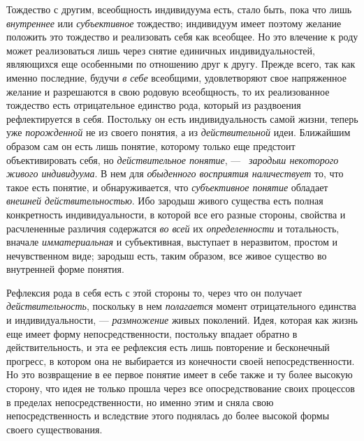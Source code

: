 \documentclass[twoside]{article}
\begin{document}
{{{Тождество с другим, всеобщность индивидуума есть, стало быть,
пока что лишь {\em внутреннее}
или {\em субъективное}
тождество; индивидуум имеет поэтому желание положить это
тождество и реализовать себя как всеобщее. Но это влечение к роду может
реализоваться лишь через снятие единичных индивидуальностей, являющихся еще
особенными по отношению друг к другу. Прежде всего, так как именно
последние, будучи {\em в себе}
всеобщими, удовлетворяют свое напряженное желание и
разрешаются в свою родовую всеобщность, то их реализованное тождество есть
отрицательное единство рода, который из раздвоения рефлектируется в себя.
Постольку он есть индивидуальность самой жизни, теперь уже
{\em порожденной} не из
своего понятия, а из
{\em действительной}
идеи. Ближайшим образом сам он есть лишь
понятие, которому только еще предстоит объективировать себя, но
{\em действительное понятие}, —
\ {\em зародыш некоторого живого
индивидуума}. В нем для
{\em обыденного восприятия
наличествует} то, что такое есть понятие, и обнаруживается,
что {\em субъективное понятие}
обладает {\em внешней
действительностью}. Ибо зародыш живого существа есть полная
конкретность индивидуальности, в которой все его разные стороны, свойства и
расчлененные различия содержатся {\em во
всей} их
{\em определенности} и
тотальность, вначале
{\em имматериальная} и
субъективная, выступает в неразвитом, простом и нечувственном виде; зародыш
есть, таким образом, все живое существо во внутренней форме понятия.

Рефлексия рода в себя есть с этой стороны то, через что он
получает {\em действительность},
поскольку в нем
{\em полагается} момент
отрицательного единства и индивидуальности, —
{\em размножение} живых
поколений. Идея, которая как жизнь еще имеет форму непосредственности,
постольку впадает обратно в действительность, и эта ее рефлексия есть лишь
повторение и бесконечный прогресс, в котором она не выбирается из
конечности своей непосредственности. Но это возвращение в ее первое понятие
имеет в себе также и ту более высокую сторону, что идея не только прошла
через все опосредствование своих процессов в пределах непосредственности,
но именно этим и сняла свою непосредственность и вследствие этого поднялась
до более высокой формы своего существования.

}}}
\end{document}
